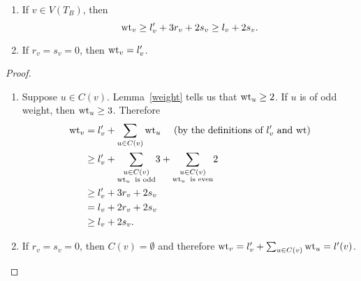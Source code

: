 \begin{lemma}\label{weightls} \hfill
\begin{enumerate}[\upshape (a)]
 \item If $v \in V(T_B)$, then \[ \operatorname{wt}_v \geq l'_v + 3r_v + 2s_v \geq l_v+2s_v.\]
 \item If $r_v = s_v = 0$, then $\operatorname{wt}_v = l'_v$.
\end{enumerate} 
\end{lemma}
\begin{proof} \hfill
\begin{enumerate}
 \item Suppose $u \in C(v)$. Lemma~\ref{weight} tells us that $\operatorname{wt}_u \geq 2$. If $u$ is of odd weight, then $\operatorname{wt}_u \geq 3$.   Therefore
\begin{align*}
 \operatorname{wt}_v &= l'_v + \sum_{u \in C(v)} \operatorname{wt}_u \ \ \ \ (\textup{by the definitions of $l'_v$ and $\operatorname{wt}$}) \\
 &\geq l'_v + {\sum_{\substack{u \in C(v) \\ \operatorname{wt}_u \ \textup{is odd}}}} 3 + {\sum_{\substack{u \in C(v) \\ \operatorname{wt}_u \ \textup{is even}}}} 2 \\
 &\geq l'_v + 3r_v + 2s_v \\
 &= l_v+2r_v+2s_v \\
 &\geq l_v+2s_v. 
\end{align*}
\item If $r_v = s_v = 0$, then $C(v) = \emptyset$ and therefore $\operatorname{wt}_v = l'_v + \sum_{u \in C(v)} \operatorname{wt}_u = l'(v)$. \qedhere
\end{enumerate}
\end{proof}

